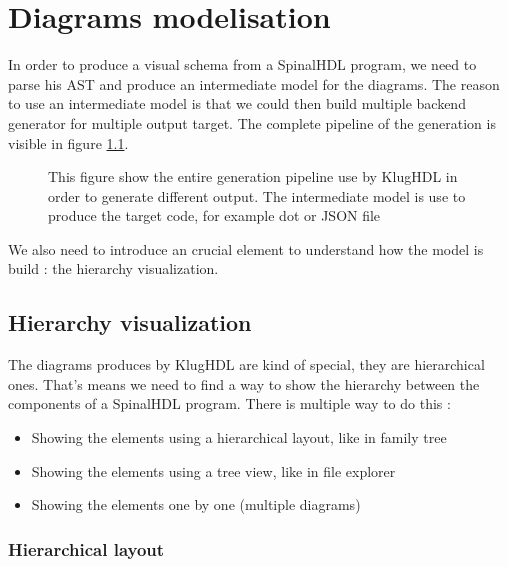 \chapter{Diagrams modelisation}

In order to produce a visual schema from a SpinalHDL program, we need to parse
his AST and produce an intermediate model for the diagrams. The reason to use
an intermediate model is that we could then build multiple backend generator
for multiple output target. The complete pipeline of the generation is visible
in figure \ref{fig:generation-pipeline}.

\begin{figure}[H] %
    \centering
    \caption[KlugHDL generation pipeline]{This figure show the entire generation pipeline use by KlugHDL in order to generate different output. The intermediate model is use to produce the target code, for example dot or JSON file}
    \label{fig:generation-pipeline}
\end{figure} %

We also need to introduce an crucial element to understand how the model is build : the hierarchy visualization.

\section{Hierarchy visualization}

The diagrams produces by KlugHDL are kind of special, they are hierarchical ones. That's means we need to find a way to show the hierarchy between the components of a SpinalHDL program. There is multiple way to do this :
\begin{itemize}
  \item Showing the elements using a hierarchical layout, like in family tree
  \item Showing the elements using a tree view, like in file explorer
  \item Showing the elements one by one (multiple diagrams)
\end{itemize}

\subsection{Hierarchical layout}
\label{sec:hierarchical-layout}

